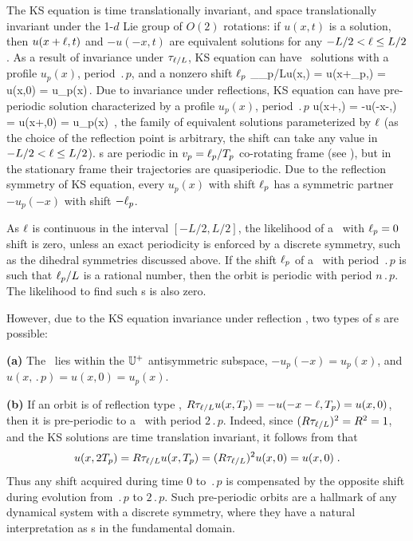 The KS equation  is time translationally invariant, and
space translationally invariant under the 1-$d$ Lie group of $O(2)$
rotations: if $u(x,t)$ is a solution, then $u(x+\ell,t)$ and
$-u(-x,t)$ are equivalent solutions for any $-L/2 < \ell \leq
L/2$.
As a result of invariance under $\tau_{\ell/L}$,
KS equation can have \rpo\ solutions
with a profile $u_p(x)$, period $\period{p}$, and a
nonzero shift $\ell_p$
\beq
  \Shift_{\shift_p/L}u(x,) =
  u(x+\shift_p,) = u(x,0) = u_p(x)\,.
\label{KSrpos}
\eeq
Due to invariance under reflections, KS equation can have
pre-periodic solution
characterized by a profile $u_p(x)$,
period $\period{p}$
\beq
  \Refl u(x+\shift,) =
  -u(-x-\shift,) = u(x+\shift,0) = u_p(x)
  \,,
\label{KSpos}
\eeq
the family of equivalent solutions
parameterized by $\ell$
(as the choice of the reflection point is arbitrary,
the shift can take any value in $-L/2 < \ell \leq L/2$).
{\Rpo s}  are periodic in
$v_p=\ell_p/{T_{p}}$ co-rotating frame (see
), but in the stationary frame their
trajectories are quasiperiodic.  Due to the reflection symmetry
 of KS equation, every {\rpo} $u_p(x)$ with shift
$\ell_p$ has a symmetric partner $-u_p(-x)$ with shift $-\ell_p$.

As $\ell$ is continuous in the interval $[-L/2, L/2]$,
the likelihood of a \rpo\ with $\ell_p = 0$ shift is zero,
unless an exact periodicity is enforced by a discrete symmetry,
such as the dihedral symmetries discussed above.
If the shift $\ell_p$ of a \rpo\ with period $\period{p}$ is such
that $\ell_p /L$ is a rational number, then the orbit is
periodic with period $n\period{p}$.  The likelihood to find such \po s is
also zero.

However, due to the KS equation invariance under reflection ,
two types of \po s are possible:

{\bf (a)} The \po\ lies within the  $\mathbb{U}^+$ antisymmetric subspace,
$-u_p(-x) = u_p(x)$, and $u(x,\period{p}) = u(x,0) = u_p(x)$.

{\bf (b)} If an
orbit is of reflection type ,
$R\tau_{\ell/L} u(x,{T_{p}}) =
-u(-x-\ell,{T_{p}}) = u(x,0)$, then it is
pre-periodic to a \po\ with period
$2\period{p}$.
Indeed, since $(R\tau_{\ell/L})^2 = R^2 = 1$,
 and the KS solutions
are time translation invariant, it follows
from  that
\[
  u(x,2{T_{p}}) = R\tau_{\ell/L} u(x,{T_{p}}) =
  (R\tau_{\ell/L})^2 u(x,0) = u(x,0)\;.
\]
Thus any shift acquired during time $0$ to
$\period{p}$ is compensated by the opposite shift during
evolution from $\period{p}$ to $2 \period{p}$.
Such pre-periodic orbits
are a hallmark of any dynamical system with a discrete
symmetry, where they have a natural
interpretation as \po s in the
fundamental domain.

